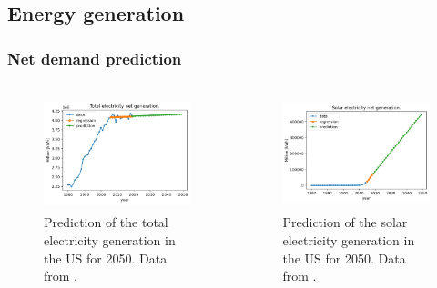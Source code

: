 \subsection{Energy generation}
\begin{frame}
\frametitle{Net demand prediction}
\begin{columns}
    \column[t]{5cm}
	\begin{figure}[htbp!]
		\begin{center}
			\includegraphics[height=3.3cm]{images/us-prediction1}
		\end{center}
		\caption{Prediction of the total electricity generation in the US for 2050. Data from \cite{us_energy_information_administration_electric_2020}.}
	\end{figure}

    \column[t]{5cm}
	\begin{figure}[htbp!]
		\begin{center}
			\includegraphics[height=3.3cm]{images/us-prediction2}
		\end{center}
		\caption{Prediction of the solar electricity generation in the US for 2050. Data from \cite{us_energy_information_administration_electric_2020}.}
	\end{figure}
\end{columns}
\end{frame}

